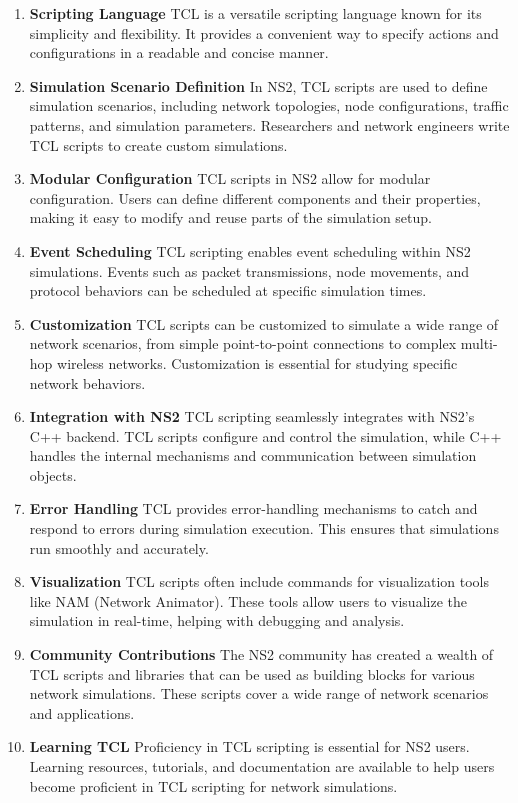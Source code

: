 \documentclass[11pt]{article}
\begin{document}
\begin{enumerate}
    \item \textbf{Scripting Language} TCL is a versatile scripting language known for its simplicity and flexibility. It provides a convenient way to specify actions and configurations in a readable and concise manner.

    \item \textbf{Simulation Scenario Definition} In NS2, TCL scripts are used to define simulation scenarios, including network topologies, node configurations, traffic patterns, and simulation parameters. Researchers and network engineers write TCL scripts to create custom simulations.

    \item \textbf{Modular Configuration} TCL scripts in NS2 allow for modular configuration. Users can define different components and their properties, making it easy to modify and reuse parts of the simulation setup.

    \item \textbf{Event Scheduling} TCL scripting enables event scheduling within NS2 simulations. Events such as packet transmissions, node movements, and protocol behaviors can be scheduled at specific simulation times.

    \item \textbf{Customization} TCL scripts can be customized to simulate a wide range of network scenarios, from simple point-to-point connections to complex multi-hop wireless networks. Customization is essential for studying specific network behaviors.

    \item \textbf{Integration with NS2} TCL scripting seamlessly integrates with NS2's C++ backend. TCL scripts configure and control the simulation, while C++ handles the internal mechanisms and communication between simulation objects.

    \item \textbf{Error Handling} TCL provides error-handling mechanisms to catch and respond to errors during simulation execution. This ensures that simulations run smoothly and accurately.

    \item \textbf{Visualization} TCL scripts often include commands for visualization tools like NAM (Network Animator). These tools allow users to visualize the simulation in real-time, helping with debugging and analysis.

    \item \textbf{Community Contributions} The NS2 community has created a wealth of TCL scripts and libraries that can be used as building blocks for various network simulations. These scripts cover a wide range of network scenarios and applications.

    \item \textbf{Learning TCL} Proficiency in TCL scripting is essential for NS2 users. Learning resources, tutorials, and documentation are available to help users become proficient in TCL scripting for network simulations.

\end{enumerate}
\end{document}
